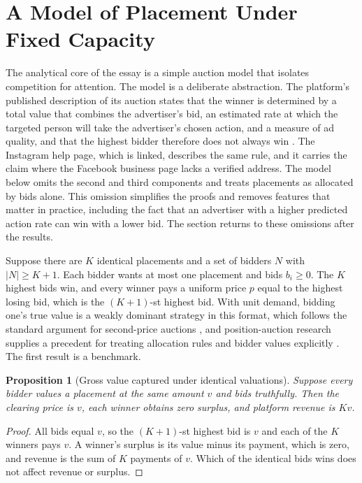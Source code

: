 \documentclass[11pt]{article}
\newtheorem{proposition}{Proposition}
\theoremstyle{definition}
\begin{document}
\section{A Model of Placement Under Fixed Capacity}

The analytical core of the essay is a simple auction model that isolates competition for attention. The model is a deliberate abstraction. The platform's published description of its auction states that the winner is determined by a total value that combines the advertiser's bid, an estimated rate at which the targeted person will take the advertiser's chosen action, and a measure of ad quality, and that the highest bidder therefore does not always win \cite{metaauction,instaml}. The Instagram help page, which is linked, describes the same rule, and it carries the claim where the Facebook business page lacks a verified address. The model below omits the second and third components and treats placements as allocated by bids alone. This omission simplifies the proofs and removes features that matter in practice, including the fact that an advertiser with a higher predicted action rate can win with a lower bid. The section returns to these omissions after the results.

Suppose there are $K$ identical placements and a set of bidders $N$ with $|N|\ge K+1$. Each bidder wants at most one placement and bids $b_i\ge 0$. The $K$ highest bids win, and every winner pays a uniform price $p$ equal to the highest losing bid, which is the $(K+1)$-st highest bid. With unit demand, bidding one's true value is a weakly dominant strategy in this format, which follows the standard argument for second-price auctions \cite{vickrey1961}, and position-auction research supplies a precedent for treating allocation rules and bidder values explicitly \cite{varian2007,edelman2007}. The first result is a benchmark.

\begin{proposition}[Gross value captured under identical valuations]\label{prop:benchmark}
Suppose every bidder values a placement at the same amount $v$ and bids truthfully. Then the clearing price is $v$, each winner obtains zero surplus, and platform revenue is $Kv$.
\end{proposition}

\begin{proof}
All bids equal $v$, so the $(K+1)$-st highest bid is $v$ and each of the $K$ winners pays $v$. A winner's surplus is its value minus its payment, which is zero, and revenue is the sum of $K$ payments of $v$. Which of the identical bids wins does not affect revenue or surplus.
\end{proof}
\end{document}
